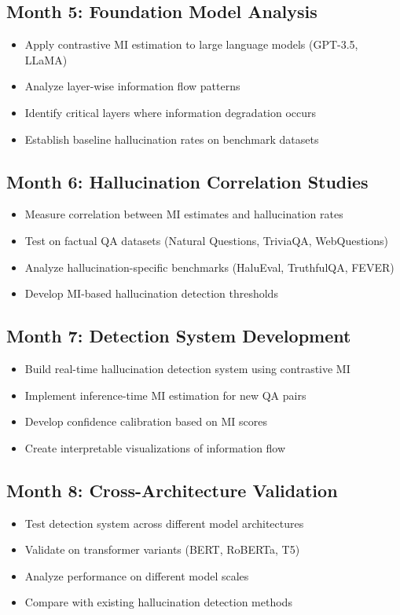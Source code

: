 \documentclass[11pt, oneside]{book}
\theoremstyle{plain}
\theoremstyle{definition}
\theoremstyle{remark}
\begin{document}
\subsection{Month 5: Foundation Model Analysis}
\begin{itemize}
    \item Apply contrastive MI estimation to large language models (GPT-3.5, LLaMA)
    \item Analyze layer-wise information flow patterns
    \item Identify critical layers where information degradation occurs
    \item Establish baseline hallucination rates on benchmark datasets
\end{itemize}

\subsection{Month 6: Hallucination Correlation Studies}
\begin{itemize}
    \item Measure correlation between MI estimates and hallucination rates
    \item Test on factual QA datasets (Natural Questions, TriviaQA, WebQuestions)
    \item Analyze hallucination-specific benchmarks (HaluEval, TruthfulQA, FEVER)
    \item Develop MI-based hallucination detection thresholds
\end{itemize}

\subsection{Month 7: Detection System Development}
\begin{itemize}
    \item Build real-time hallucination detection system using contrastive MI
    \item Implement inference-time MI estimation for new QA pairs
    \item Develop confidence calibration based on MI scores
    \item Create interpretable visualizations of information flow
\end{itemize}

\subsection{Month 8: Cross-Architecture Validation}
\begin{itemize}
    \item Test detection system across different model architectures
    \item Validate on transformer variants (BERT, RoBERTa, T5)
    \item Analyze performance on different model scales
    \item Compare with existing hallucination detection methods
\end{itemize}
\end{document}
